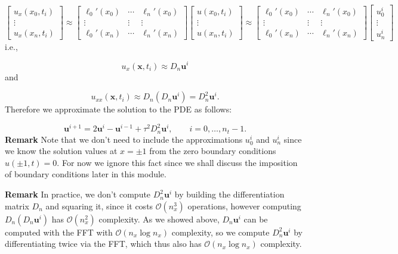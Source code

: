 \documentclass[12pt,a4paper]{article}
\begin{document}
\[
\begin{bmatrix}
u_x(x_0,t_i) \\
\vdots \\
u_x(x_n,t_i)
\end{bmatrix} \approx 
\begin{bmatrix}
\ell_0'(x_0) & \cdots & \ell_n'(x_0) \\
\vdots & \vdots  & \vdots \\
\ell_0'(x_n) & \cdots & \ell_n'(x_n)
\end{bmatrix}
\begin{bmatrix}
u(x_0,t_i) \\
\vdots \\
u(x_n,t_i) 
\end{bmatrix}
\approx
\begin{bmatrix}
\ell_0'(x_0) & \cdots & \ell_n'(x_0) \\
\vdots & \vdots  & \vdots \\
\ell_0'(x_n) & \cdots & \ell_n'(x_n)
\end{bmatrix}
\begin{bmatrix}
u_0^i \\
\vdots \\
u_n^i
\end{bmatrix}
\]
i.e.,

\[
u_{x}(\mathbf{x},t_i) \approx D_n\mathbf{u}^{i}
\]
and

\[
u_{xx}(\mathbf{x},t_i) \approx D_n\left(D_n\mathbf{u}^{i}\right) = D_n^2\mathbf{u}^{i}.
\]
Therefore we approximate the solution to the PDE as follows:

\[
\mathbf{u}^{i+1} = 2\mathbf{u}^{i} - \mathbf{u}^{i-1} + \tau^2 D_n^2\mathbf{u}^{i}, \qquad i = 0, \ldots, n_t-1.
\]
\textbf{Remark} Note that we don't need to include the approximations $u_0^{i}$ and $u_n^{i}$ since we know the solution values at $x = \pm 1$ from the zero boundary conditions $u(\pm 1, t) = 0$.  For now we ignore this fact since we shall discuss the imposition of boundary conditions later in this module.

\textbf{Remark} In practice, we don't compute $D_n^2\mathbf{u}^{i}$ by building the differentiation matrix $D_n$ and squaring it, since it costs $\mathcal{O}(n_x^3)$ operations, however computing $D_n(D_n\mathbf{u}^{i})$ has $\mathcal{O}(n_x^2)$ complexity. As we showed above, $D_n\mathbf{u}^{i}$ can be computed with the FFT with $\mathcal{O}(n_x\log n_x)$ complexity, so we compute $D_n^2\mathbf{u}^{i}$ by differentiating twice via the FFT, which thus also has $\mathcal{O}(n_x\log n_x)$ complexity.
\end{document}
